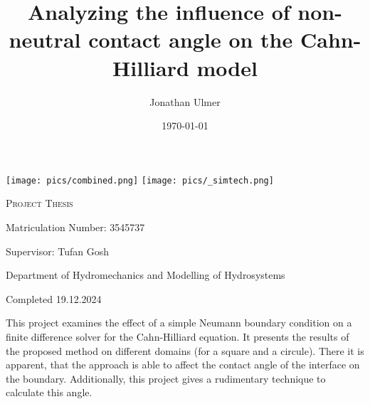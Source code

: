 \documentclass{mimosis}
\author{Jonathan Ulmer}
\date{\today}
\title{Analyzing the influence of non-neutral contact angle on the Cahn-Hilliard model}
\newenvironment{abstract} {}{}
\begin{document}
\frontmatter
\makeatletter
\begin{titlepage}
    \centering
\texttt{[image: pics/combined.png]}
\texttt{[image: pics/\_simtech.png]}
\par
	\vspace{1.5cm}
	{\scshape\huge Project Thesis \par}
	\vspace{1.5cm}
	{\Huge\bfseries  \@title \par}
	\vspace{2cm}
	{\LARGE \@author \par}
	{\Large Matriculation Number: 3545737 \par}
	\vspace{1.5cm}
	{\large Supervisor: Tufan Gosh\par}
	\vspace{1.5cm}
	{\large Department of Hydromechanics and Modelling of Hydrosystems \par}



	\vfill

	{\large Completed 19.12.2024 \par}
\end{titlepage}
\makeatother

\begin{abstract}
This project examines the effect of a simple Neumann boundary condition on a finite difference solver for the Cahn-Hilliard equation. It presents the results of the proposed method on different domains (for a square and a circule). There it is apparent, that the approach is able to affect the contact angle of the interface on the boundary. Additionally, this project gives a rudimentary technique to calculate this angle.
\end{abstract}

\setcounter{tocdepth}{3}
\tableofcontents
\listoffigures
\mainmatter
\end{document}
